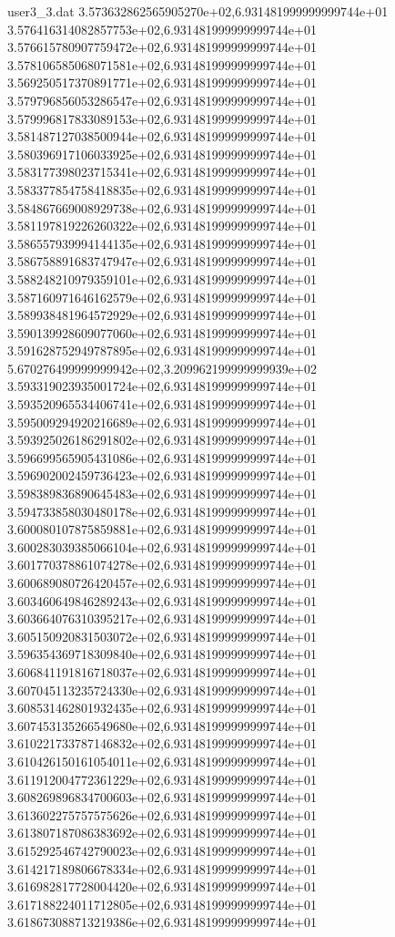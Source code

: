 \begin{filecontents}{user3_3.dat}
3.573632862565905270e+02,6.931481999999999744e+01
3.576416314082857753e+02,6.931481999999999744e+01
3.576615780907759472e+02,6.931481999999999744e+01
3.578106585068071581e+02,6.931481999999999744e+01
3.569250517370891771e+02,6.931481999999999744e+01
3.579796856053286547e+02,6.931481999999999744e+01
3.579996817833089153e+02,6.931481999999999744e+01
3.581487127038500944e+02,6.931481999999999744e+01
3.580396917106033925e+02,6.931481999999999744e+01
3.583177398023715341e+02,6.931481999999999744e+01
3.583377854758418835e+02,6.931481999999999744e+01
3.584867669008929738e+02,6.931481999999999744e+01
3.581197819226260322e+02,6.931481999999999744e+01
3.586557939994144135e+02,6.931481999999999744e+01
3.586758891683747947e+02,6.931481999999999744e+01
3.588248210979359101e+02,6.931481999999999744e+01
3.587160971646162579e+02,6.931481999999999744e+01
3.589938481964572929e+02,6.931481999999999744e+01
3.590139928609077060e+02,6.931481999999999744e+01
3.591628752949787895e+02,6.931481999999999744e+01
5.670276499999999942e+02,3.209962199999999939e+02
3.593319023935001724e+02,6.931481999999999744e+01
3.593520965534406741e+02,6.931481999999999744e+01
3.595009294920216689e+02,6.931481999999999744e+01
3.593925026186291802e+02,6.931481999999999744e+01
3.596699565905431086e+02,6.931481999999999744e+01
3.596902002459736423e+02,6.931481999999999744e+01
3.598389836890645483e+02,6.931481999999999744e+01
3.594733858030480178e+02,6.931481999999999744e+01
3.600080107875859881e+02,6.931481999999999744e+01
3.600283039385066104e+02,6.931481999999999744e+01
3.601770378861074278e+02,6.931481999999999744e+01
3.600689080726420457e+02,6.931481999999999744e+01
3.603460649846289243e+02,6.931481999999999744e+01
3.603664076310395217e+02,6.931481999999999744e+01
3.605150920831503072e+02,6.931481999999999744e+01
3.596354369718309840e+02,6.931481999999999744e+01
3.606841191816718037e+02,6.931481999999999744e+01
3.607045113235724330e+02,6.931481999999999744e+01
3.608531462801932435e+02,6.931481999999999744e+01
3.607453135266549680e+02,6.931481999999999744e+01
3.610221733787146832e+02,6.931481999999999744e+01
3.610426150161054011e+02,6.931481999999999744e+01
3.611912004772361229e+02,6.931481999999999744e+01
3.608269896834700603e+02,6.931481999999999744e+01
3.613602275757575626e+02,6.931481999999999744e+01
3.613807187086383692e+02,6.931481999999999744e+01
3.615292546742790023e+02,6.931481999999999744e+01
3.614217189806678334e+02,6.931481999999999744e+01
3.616982817728004420e+02,6.931481999999999744e+01
3.617188224011712805e+02,6.931481999999999744e+01
3.618673088713219386e+02,6.931481999999999744e+01

\end{filecontents}
